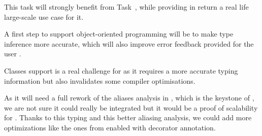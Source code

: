 \begin{workpackage}[id=hpc,wphases=36-48,
  title=High Performance Computing,
  PSRM=1, %
  LLRM=12, %
  SARM=1, %
  UKRM=1, %
  UBRM=1, %
  UJFRM=12]
\begin{tasklist}
\begin{task}[title=\Pythran for \Sage and \Sage Users,id=pythran-sage]
  This task will strongly benefit from Task~,
  while providing in return a real life large-scale use case for it.

  A first step to support object-oriented programming will be to make
  \Pythran type inference more accurate, which will also improve error
  feedback provided for the user .
\end{task}

\begin{task}[title=Explorative task: Add support for classes in \Pythran.]
  Classes support is a real challenge for \Pythran as it requires a more
  accurate typing information but also invalidates some compiler optimisations.

  As it will need a full rework of the aliases analysis in \Pythran, which is
  the keystone of \Pythran, we are not sure it could really
  be integrated but it would be a proof of scalability for \Pythran.
  Thanks to this typing and this better aliasing analysis, we could add more
  optimizations like the ones from \Cython enabled with decorator annotation.
\end{task}
\end{tasklist}


\end{workpackage}
